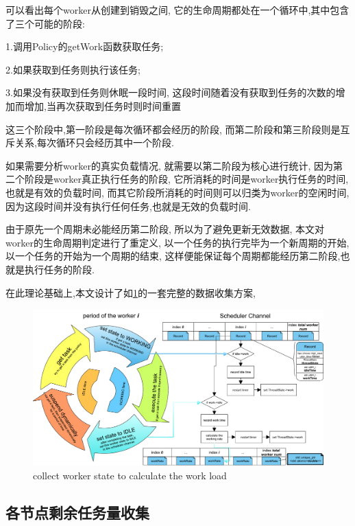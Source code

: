 \documentclass{mproj}
\begin{document}
可以看出每个worker从创建到销毁之间,
它的生命周期都处在一个循环中,其中包含了三个可能的阶段:

1.调用Policy的getWork函数获取任务;

2.如果获取到任务则执行该任务;

3.如果没有获取到任务则休眠一段时间,
这段时间随着没有获取到任务的次数的增加而增加,当再次获取到任务时则时间重置

这三个阶段中,第一阶段是每次循环都会经历的阶段,
而第二阶段和第三阶段则是互斥关系,每次循环只会经历其中一个阶段.

如果需要分析worker的真实负载情况,
就需要以第二阶段为核心进行统计,
因为第二个阶段是worker真正执行任务的阶段,
它所消耗的时间是worker执行任务的时间,也就是有效的负载时间,
而其它阶段所消耗的时间则可以归类为worker的空闲时间,
因为这段时间并没有执行任何任务,也就是无效的负载时间.

由于原先一个周期未必能经历第二阶段,
所以为了避免更新无效数据,
本文对worker的生命周期判定进行了重定义,
以一个任务的执行完毕为一个新周期的开始,
以一个任务的开始为一个周期的结束,
这样便能保证每个周期都能经历第二阶段,也就是执行任务的阶段.

在此理论基础上,本文设计了如\cref{fig:worker_collect_calculate}的一套完整的数据收集方案,

\begin{figure}[h]
    \centering %
    \includegraphics[width=1.0\textwidth]{images/worker_collect_calculate.pdf} %
    \caption{collect worker state to calculate the work load} %
    \label{fig:worker_collect_calculate} %
\end{figure}
\FloatBarrier




\subsection{各节点剩余任务量收集}
\end{document}
